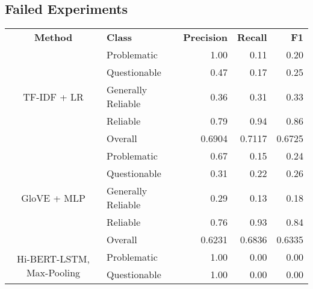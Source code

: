 \subsection{Failed Experiments}

\begin{table}[htbp]
    \centering
    \scriptsize
    \begin{longtable}{| c | l | r | r | r |}
        \hline                            \textbf{Method} & \textbf{Class}     & \textbf{Precision} & \textbf{Recall} & \textbf{F1} \\\cline{1-5}
        \multirow{5}{*}{TF-IDF + LR}                      & Problematic        & 1.00               & 0.11            & 0.20        \\
                                                          & Questionable       & 0.47               & 0.17            & 0.25        \\
                                                          & Generally Reliable & 0.36               & 0.31            & 0.33        \\
                                                          & Reliable           & 0.79               & 0.94            & 0.86        \\\cline{2-5}
                                                          & Overall            & 0.6904             & 0.7117          & 0.6725      \\
        \hline
        \multirow{5}{*}{GloVE + MLP}                      & Problematic        & 0.67               & 0.15            & 0.24        \\
                                                          & Questionable       & 0.31               & 0.22            & 0.26        \\
                                                          & Generally Reliable & 0.29               & 0.13            & 0.18        \\
                                                          & Reliable           & 0.76               & 0.93            & 0.84        \\\cline{2-5}
                                                          & Overall            & 0.6231             & 0.6836          & 0.6335      \\
        \hline
        \multirow{5}{*}{Hi-BERT-LSTM, Max-Pooling}        & Problematic        & 1.00               & 0.00            & 0.00        \\
                                                          & Questionable       & 1.00               & 0.00            & 0.00        \\

\end{longtable}
\end{table}

